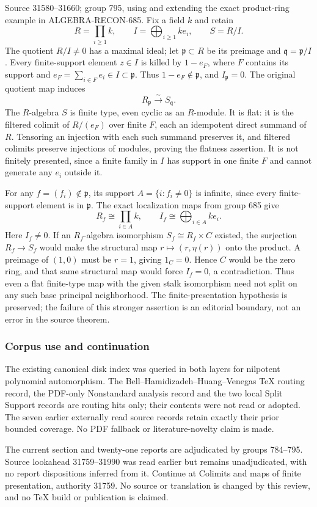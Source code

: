 Source 31580--31660; group 795, using and extending the exact product-ring example in ALGEBRA-RECON-685. Fix a field \(k\) and retain \[
R=\prod_{i\ge1}k,\qquad I=\bigoplus_{i\ge1}ke_i,\qquad S=R/I.
\] The quotient \(R/I\ne0\) has a maximal ideal; let \(\mathfrak p\subset R\) be its preimage and \(\mathfrak q=\mathfrak p/I\). Every finite-support element \(z\in I\) is killed by \(1-e_F\), where \(F\) contains its support and \(e_F=\sum_{i\in F}e_i\in I\subset\mathfrak p\). Thus \(1-e_F\notin\mathfrak p\), and \(I_{\mathfrak p}=0\). The original quotient map induces \[
R_{\mathfrak p}\xrightarrow{\sim}S_{\mathfrak q}.
\] The \(R\)-algebra \(S\) is finite type, even cyclic as an \(R\)-module. It is flat: it is the filtered colimit of \(R/(e_F)\) over finite \(F\), each an idempotent direct summand of \(R\). Tensoring an injection with each such summand preserves it, and filtered colimits preserve injections of modules, proving the flatness assertion. It is not finitely presented, since a finite family in \(I\) has support in one finite \(F\) and cannot generate any \(e_i\) outside it.

For any \(f=(f_i)\notin\mathfrak p\), its support \(A=\{i:f_i\ne0\}\) is infinite, since every finite-support element is in \(\mathfrak p\). The exact localization maps from group 685 give \[
R_f\cong\prod_{i\in A}k,\qquad I_f\cong\bigoplus_{i\in A}ke_i.
\] Here \(I_f\ne0\). If an \(R_f\)-algebra isomorphism \(S_f\cong R_f\times C\) existed, the surjection \(R_f\to S_f\) would make the structural map \(r\mapsto(r,\eta(r))\) onto the product. A preimage of \((1,0)\) must be \(r=1\), giving \(1_C=0\). Hence \(C\) would be the zero ring, and that same structural map would force \(I_f=0\), a contradiction. Thus even a flat finite-type map with the given stalk isomorphism need not split on any such base principal neighborhood. The finite-presentation hypothesis is preserved; the failure of this stronger assertion is an editorial boundary, not an error in the source theorem.

\subsubsection{Corpus use and continuation}\label{corpus-use-and-continuation}

The existing canonical disk index was queried in both layers for nilpotent polynomial automorphism. The Bell--Hamidizadeh--Huang--Venegas TeX routing record, the PDF-only Nonstandard analysis record and the two local Split Support records are routing hits only; their contents were not read or adopted. The seven earlier externally read source records retain exactly their prior bounded coverage. No PDF fallback or literature-novelty claim is made.

The current section and twenty-one reports are adjudicated by groups 784--795. Source lookahead 31759--31990 was read earlier but remains unadjudicated, with no report dispositions inferred from it. Continue at Colimits and maps of finite presentation, authority 31759. No source or translation is changed by this review, and no TeX build or publication is claimed.
